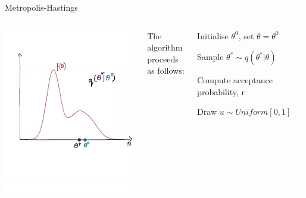\documentclass[compress]{beamer}
\begin{document}
\begin{frame}[label=sec-7-11]{Metropolis-Hastings}
    \begin{columns}[c] 
    \includegraphics[width=1\linewidth]{MH2}

    The algorithm proceeds as follows:\\
    \begin{enumerate}
        \item Initialise $\theta^{0}$, set $\theta = \theta^{0}$
        \item Sample $\theta^* \sim q(\theta^*|\theta)$
        \item Compute acceptance probability, r
        \item Draw $u \sim Uniform[0,1]$
        \textcolor{white}{
            \item[\color{white}] Set new sample to 
            \[
               \theta^{(s+1)} = 
               \begin{cases}
                \theta^*, & \text{if } u < r\\
                \theta^{(s)}, & \text{if } u \geqslant r
            \end{cases}
        \]
        \item[\color{white}] Repeat steps 2-5
    }
\end{enumerate}
\end{columns}
\end{frame}
\end{document}

